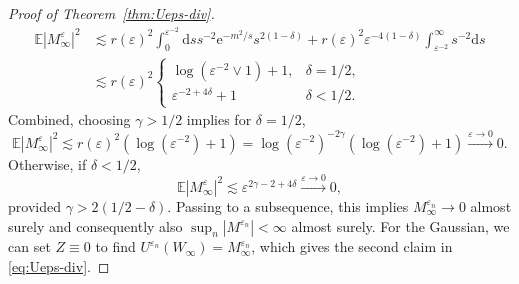 \documentclass[11pt, a4paper]{scrartcl}
\numberwithin{equation}{section}
\theoremstyle{plain}
\theoremstyle{remark}
\newcommand{\mathd}{\mathrm{d}}
\newcommand{\mathe}{\mathrm{e}}
\begin{document}
\begin{proof}[Proof of Theorem~\ref{thm:Ueps-div}]
\[\begin{aligned}
			\mathbb{E} | M_{\infty}^{\varepsilon} |^2 & \lesssim  r
			(\varepsilon)^2  \int_0^{\varepsilon^{- 2}} \mathd ss^{- 2} \mathe^{-
				m^2 / s} s^{2 (1 - \delta)} + r (\varepsilon)^2 \varepsilon^{- 4 (1 -
			\delta)} \int_{\varepsilon^{- 2}}^{\infty} s^{- 2} \mathd s                                                                    \\
			                                          & \lesssim  r (\varepsilon)^2 \begin{cases}
				                                                                        \log (\varepsilon^{- 2} \vee 1) + 1, & \delta = 1 / 2, \\
				                                                                        \varepsilon^{- 2 + 4 \delta} + 1     & \delta < 1 / 2.
			                                                                        \end{cases}
		\end{aligned} \]
	Combined, choosing $\gamma > 1 / 2$ implies for $\delta = 1 / 2$,
	\[ \mathbb{E} | M_{\infty}^{\varepsilon} |^2 \lesssim r (\varepsilon)^2
		(\log (\varepsilon^{- 2}) + 1) = \log (\varepsilon^{- 2})^{- 2 \gamma}
		(\log (\varepsilon^{- 2}) + 1) \overset{\varepsilon \rightarrow
			0}{\longrightarrow} 0. \]
	Otherwise, if $\delta < 1 / 2$,
	\[ \mathbb{E} | M_{\infty}^{\varepsilon} |^2 \lesssim \varepsilon^{2 \gamma
			- 2 + 4 \delta} \overset{\varepsilon \rightarrow 0}{\longrightarrow} 0,
	\]
	provided $\gamma > 2 (1 / 2 - \delta) $. Passing to a subsequence, this
	implies $M^{\varepsilon_n}_{\infty} \rightarrow 0$ almost surely and
	consequently also $\sup_n | M^{\varepsilon_n} | < \infty$ almost surely.
	For the Gaussian, we can set $Z\equiv 0$ to find
	$U^{\varepsilon_n} (W_{\infty}) = M_{\infty}^{\varepsilon_n}$, which
	gives the second claim in \eqref{eq:Ueps-div}.


\end{proof}
\end{document}
